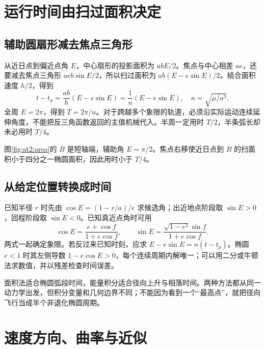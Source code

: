 \section{运行时间由扫过面积决定}
\subsection{辅助圆扇形减去焦点三角形}

从近日点到偏近点角 $E$，中心扇形的投影面积为 $abE/2$。焦点与中心相差 $ae$，还要减去焦点三角形 $aeb\sin E/2$，所以扫过面积为 $ab(E-e\sin E)/2$。结合面积速度 $h/2$，得到
\[t-t_p=\frac{ab}{h}(E-e\sin E)=\frac1n(E-e\sin E),\quad n=\sqrt{\mu/a^3}.
\]
全周 $E=2\pi$，得到 $T=2\pi/n$。对于跨越多个象限的轨道，必须沿实际运动连续延伸角度，不能把反三角函数返回的主值机械代入。半周一定用时 $T/2$，半条弧长却未必用时 $T/4$。

图\ref{fig:at2:area}的 $B$ 是短轴端，辅助角 $E=\pi/2$。焦点右移使近日点到 $B$ 的扫面积小于四分之一椭圆面积，因此用时小于 $T/4$。\subsection{从给定位置转换成时间}

已知半径 $r$ 时先由 $\cos E=(1-r/a)/e$ 求候选角；出近地点阶段取 $\sin E>0$，回程阶段取 $\sin E<0$。已知真近点角时可用
\[\cos E=\frac{e+\cos f}{1+e\cos f},\qquad
\sin E=\frac{\sqrt{1-e^2}\sin f}{1+e\cos f}.
\]
两式一起确定象限。若反过来已知时刻，应求 $E-e\sin E=n(t-t_p)$。椭圆 $e<1$ 时其左侧导数 $1-e\cos E>0$，每个连续周期内解唯一；可以用二分或牛顿法求数值，并以残差检查时间误差。

面积法适合椭圆弧段时间，能量积分适合径向上升与相落时间。两种方法都从同一动力学出发，但积分变量和几何边界不同；不能因为看到一个“最高点”，就把径向飞行当成半个非退化椭圆周期。


\section{速度方向、曲率与近似}
